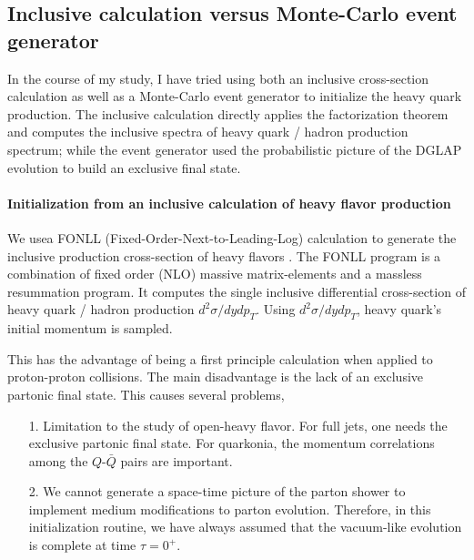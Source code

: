 \subsection{Inclusive calculation versus Monte-Carlo event generator}
In the course of my study, I have tried using both an inclusive cross-section calculation as well as a Monte-Carlo event generator to initialize the heavy quark production.
The inclusive calculation directly applies the factorization theorem and computes the inclusive spectra of heavy quark / hadron production spectrum; while the event generator used the probabilistic picture of the DGLAP evolution to build an exclusive final state.

\paragraph{Initialization from an inclusive calculation of heavy flavor production}
We usea  FONLL (Fixed-Order-Next-to-Leading-Log) calculation to generate the inclusive production cross-section of heavy flavors \cite{Cacciari:1998it}.
The FONLL program is a combination of fixed order (NLO) massive matrix-elements and a massless resummation program.
It computes the single inclusive differential cross-section of heavy quark / hadron production $d^2\sigma/dydp_T$.
Using $d^2\sigma/dydp_T$, heavy quark's initial momentum is sampled.

This has the advantage of being a first principle calculation when applied to proton-proton collisions. 
The main disadvantage is the lack of an exclusive partonic final state.
This causes several problems,
\begin{itemize}
\item[1.] Limitation to the study of open-heavy flavor.
For full jets, one needs the exclusive partonic final state. For quarkonia, the momentum correlations among the $Q$-$\bar{Q}$ pairs are important.
\item[2.] We cannot generate a space-time picture of the parton shower to implement medium modifications to parton evolution. 
Therefore, in this initialization routine, we have always assumed that the vacuum-like evolution is complete at time $\tau=0^{+}$.
\end{itemize}

